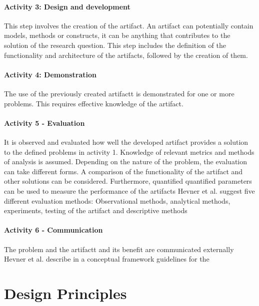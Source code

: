 \paragraph{Activity 3: Design and development}
This step involves the creation of the artifact. An artifact can potentially contain models,
methods or constructs, it can be anything that contributes to the solution of the research question.
This step includes the definition of the functionality and architecture of the artifacts,
followed by the creation of them.
\cite[p. 55]{peffers_designscienceresearch_2007}

\paragraph{Activity 4: Demonstration}
The use of the previously created artifactt is demonstrated for one or more problems.
This requires effective knowledge of the artifact.
\cite[p. 55]{peffers_designscienceresearch_2007}

\paragraph{Activity 5 - Evaluation}
It is observed and evaluated how well the developed artifact provides a solution to the defined
problems in activity 1.
Knowledge of relevant metrics and methods of analysis is assumed. Depending on the nature of the
problem, the evaluation can take different forms.
A comparison of the functionality of the artifact and other solutions can be considered.
Furthermore, quantified
quantified parameters can be used to measure the performance of the artifacts
\cite[p. 56]{peffers_designscienceresearch_2007}
Hevner et al. suggest five different evaluation methods: Observational
methods, analytical methods, experiments, testing of the artifact and descriptive
methods
\cite[p. 87]{hevner_designscienceinformation_2004}

\paragraph{Activity 6 - Communication}
The problem and the artifactt and its benefit are communicated externally
\cite[p. 56]{peffers_designscienceresearch_2007}
Hevner et al. describe in a conceptual framework guidelines for the


\section{Design Principles}

